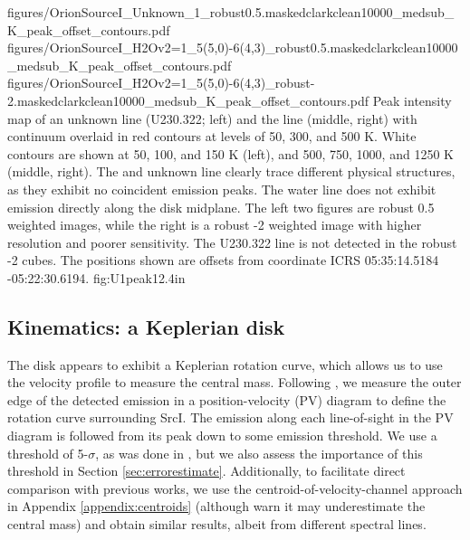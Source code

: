 \documentclass[twocolumn]{aastex61}
\newcommand{\sourcei}{SrcI\xspace}
\begin{document}
\FigureThree
{{figures/OrionSourceI_Unknown_1_robust0.5.maskedclarkclean10000_medsub_K_peak_offset_contours}.pdf}
{{figures/OrionSourceI_H2Ov2=1_5(5,0)-6(4,3)_robust0.5.maskedclarkclean10000_medsub_K_peak_offset_contours}.pdf}
{{figures/OrionSourceI_H2Ov2=1_5(5,0)-6(4,3)_robust-2.maskedclarkclean10000_medsub_K_peak_offset_contours}.pdf}
{Peak intensity map of an unknown line (U230.322; left) and the \water
line (middle, right) with continuum overlaid
in red contours at levels of 
50,  300, and 500 K. %
White contours are shown at 50, 100, and 150 K (left), and  500, 750, 1000, and 1250 K
(middle, right).
The \water and unknown line clearly trace different physical structures, as
they exhibit no coincident emission peaks.  The water line does
not exhibit emission directly along the disk midplane.
The left two figures are robust 0.5 weighted images, while the right
is a robust -2 weighted image with higher resolution and poorer
sensitivity.  The U230.322 line is not detected in the robust -2 cubes.
The positions shown are offsets from coordinate ICRS 05:35:14.5184 -05:22:30.6194.
}
{fig:U1peak}{1}{2.4in}


\subsection{Kinematics: a Keplerian disk}
\label{sec:kinematics}
The disk appears to exhibit a Keplerian rotation curve, which allows us to use
the velocity profile to measure the central mass.
Following \citet{Seifried2016a}, we measure the outer edge of the detected
emission in a position-velocity (PV) diagram to define the rotation curve
surrounding \sourcei. 
The emission along each line-of-sight
in the PV diagram is followed from
its peak down to some emission threshold.
We use a threshold of 5-$\sigma$, as was done in \citet{Seifried2016a}, but we
also assess the importance of this threshold in Section
\ref{sec:errorestimate}.
Additionally, to facilitate direct comparison with
previous works, we use the centroid-of-velocity-channel approach
in Appendix \ref{appendix:centroids} (although 
\citet{Seifried2016a} warn it may underestimate the central mass)
and obtain similar results, albeit from different spectral lines.
\end{document}
